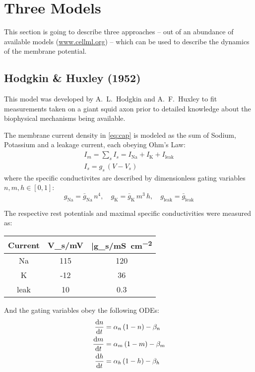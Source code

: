 \newcommand{\Vtilde}{\ensuremath{\tilde{V}}}

\section{Three Models}
This section is going to describe three approaches -- out of an abundance of
available models (\url{www.cellml.org}) -- which can be used to describe the
dynamics of the membrane potential.

\subsection{Hodgkin \& Huxley (1952)}
This model was developed by A.~L.~Hodgkin and A.~F.~Huxley to fit
measurements taken on a giant squid axon prior to detailed knowledge about
the biophysical mechanisms being available.

The membrane current density in \eqref{eq:cap} is modeled as the sum of Sodium,
Potassium and a leakage current, each obeying Ohm's Law:
\begin{gather*}
    I_m = \sum_{s}I_{s}=I_{\mathrm{Na}}+I_{\mathrm{K}}+I_{\mathrm{leak}} \\
    I_s = g_s\,(V-V_s)
\end{gather*}
where the specific conductivites are described by dimensionless gating
variables $n, m, h\in[0,1]$:
\begin{equation*}
    g_{\mathrm{Na}}=\bar{g}_{\mathrm{Na}}\,n^4,\quad
    g_{\mathrm{K}}=\bar{g}_{\mathrm{K}}\,m^3\,h,\quad
    g_{\mathrm{leak}}=\bar{g}_{\mathrm{leak}}
\end{equation*}

The respective rest potentials and maximal specific conductivities were measured as:
\begin{table}[h!]
    \centering
    \begin{tabular}{c | C C}
        \toprule
        Current & V_s/\si{\milli\volt} &
        \bar{g}_s/\si{\milli\siemens\per\centi\metre\squared} \\
        \midrule
        Na      & 115   & 120   \\
        K       & -12   & 36    \\
        leak    & 10    & 0.3   \\
        \bottomrule
    \end{tabular}
\end{table}

And the gating variables obey the following ODEs:
\begin{subequations}
\begin{align}
    \dv{n}{t}&=\alpha_{n}\,(1-n)-\beta_{n} \label{eq:n} \\
    \dv{m}{t}&=\alpha_{m}\,(1-m)-\beta_{m} \label{eq:m} \\
    \dv{h}{t}&=\alpha_{h}\,(1-h)-\beta_{h} \label{eq:h}
\end{align}
\end{subequations}

